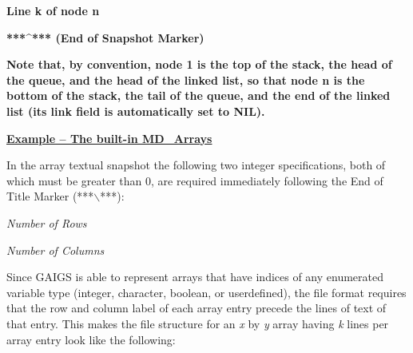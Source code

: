 \documentclass[12pt]{article}
\begin{document}
\begin{flushleft}
\textbf{{\footnotesize{}      Line k of node  n}}
\end{flushleft}

\begin{flushleft}
\textbf{{\footnotesize{}      ***\^{}***  (End of Snapshot Marker)}}
\end{flushleft}

\begin{flushleft}

\end{flushleft}

\begin{flushleft}
\textbf{{\footnotesize{}Note that, by convention, node 1 is the top of the stack, the head of the queue, and the head of the linked list, so that node n is the bottom of the stack, the tail of the queue, and the end of the linked list (its link field is automatically set to NIL).}}
\end{flushleft}

\begin{flushleft}

\end{flushleft}




\begin{flushleft}
\textbf{\uline{{\footnotesize{}Example -- The built-in MD\_Arrays}}}\textbf{{\footnotesize{} }}
\end{flushleft}



{\footnotesize{}In the array textual snapshot the following two integer specifications, both of which must be greater than 0, are required immediately following the End of Title Marker (***\ensuremath{\backslash}***):}

{\footnotesize{}   }

\textit{{\footnotesize{}                Number of Rows }}

\textit{{\footnotesize{}                Number of  Columns  }}

\textit{{\footnotesize{}                }}

{\footnotesize{}Since GAIGS is able to represent arrays that have indices of any enumerated variable type (integer, character, boolean, or userdefined), the file format requires that the row and column label of each array entry precede the lines of text of that entry.  This makes the file structure for an }\textit{{\footnotesize{}x}}{\footnotesize{} by }\textit{{\footnotesize{}y}}{\footnotesize{}  array having }\textit{{\footnotesize{}k}}{\footnotesize{} lines per array entry look like the following:}
\end{document}
